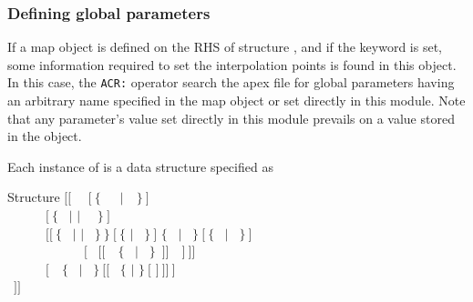 \subsubsection{Defining global parameters}\label{sect:ACRdescints}

\vskip -0.5cm

If a {\sc map} object is defined on the RHS of structure , and if the  keyword is set, some information required to set the interpolation points is found in this object.
In this case, the {\tt ACR:} operator search the {\sc apex} file for global parameters  having an arbitrary name specified in the {\sc map} object or set directly in this module.
Note that any parameter's value set directly in this module prevails on a value stored in the  object.

Each instance of  is a data structure specified as

\begin{DataStructure}{Structure }
$[[$~ ~$[~\{$~~~$|$~~$\}~]$ \\
~~~~~~$[~\{$~ $|$  $|$ ~~$\}~]$ \\
~~~~~~$[[~\{$~ $|$  $|$ ~$\}~\}~[~\{$  $|$ ~$\}~]$  $\{$~ $|$ ~$\}~[~\{$~ $|$ ~$\}~]$ \\
~~~~~~~~~~~~$[$~ $[[$~~$\{$~ $|$ ~$\}$~$]]$~~$]~]]$  \\
~~~~~~$[$~~$\{$~ $|$ ~$\}~[[$~ $\{$  $|$ \moc{*} $\}~[$  $]~]]~]$ \\
~$]]$
\end{DataStructure}

